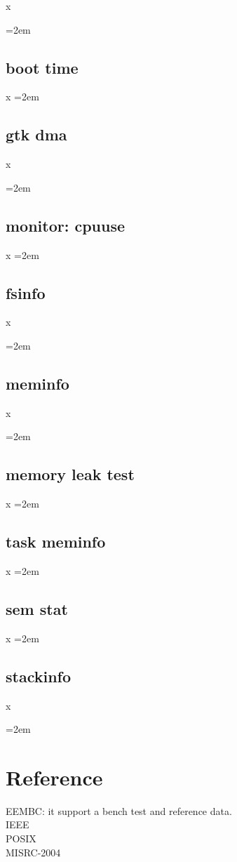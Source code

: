 \documentclass[a4paper]{article}
\let\oldsection\section
\renewcommand{\section}{\leftskip=2em \oldsection}
\let\oldsubsection\subsection
\renewcommand{\subsection}{\leftskip=2em \oldsubsection}
\begin{document}
x

\subsection{boot time}

x
\subsection{gtk dma}
x

\subsection{monitor: cpuuse}

x
\subsection{fsinfo}
x

\subsection{meminfo}
x

\subsection{memory leak test}

x
\subsection{task meminfo}

x
\subsection{sem stat}

x
\subsection{stackinfo}

x

\newpage
\section{Reference}


EEMBC: it support a bench test and reference data.\\
IEEE\\
POSIX\\
MISRC-2004\\
\end{document}
